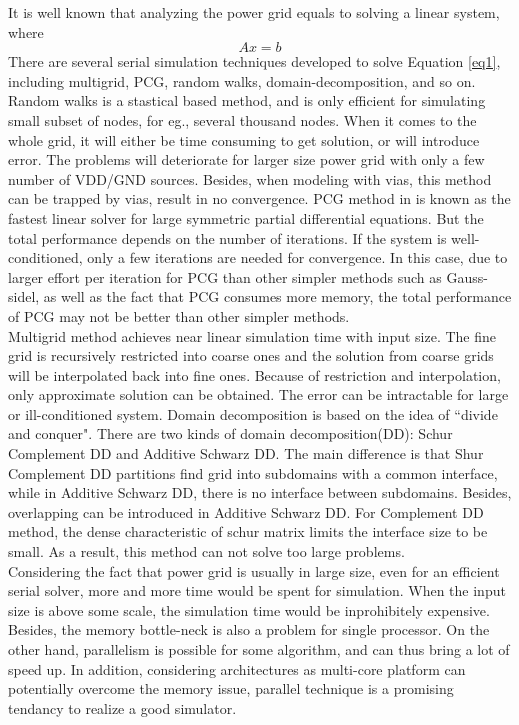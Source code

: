 \documentclass{sig-alternate}
\begin{document}
	It is well known that analyzing the power grid equals to solving a linear system, where 
	\begin{equation}\label{eq1}
		Ax=b
	\end{equation}
	There are several serial simulation techniques developed to solve Equation \eqref{eq1}, including multigrid\cite{kozhaya}, 
	PCG\cite{Tsung-Hao}, random walks\cite{Boghrati}, domain-decomposition\cite{Quming,Zhongyu}, and so on. Random walks 
	is a stastical based method, and is only efficient for simulating small subset of nodes, for eg., several thousand nodes.
	When it comes to the whole grid, it will either be time consuming to get solution, or will introduce error. The problems
	will deteriorate for larger size power grid with only a few number of VDD/GND sources. Besides, when modeling with vias, 
	this method can be trapped by vias, result in no convergence. PCG method in\cite{Tsung-Hao} is known as the fastest 
	linear solver 
	for large symmetric partial differential equations. But the total performance depends on the number of iterations. If the
	system is well-conditioned, only a few iterations are needed for convergence. In this case, due to larger effort per iteration
	for PCG than other simpler methods such as Gauss-sidel, as well as the fact that PCG consumes more memory, the total 
	performance of PCG may not be better than other simpler methods.\\	
	
	Multigrid method achieves near linear simulation time with input size. The fine grid is recursively restricted into coarse ones 
	and the solution from coarse grids will be interpolated back into fine ones. Because of restriction and interpolation, 
	only approximate solution can be obtained. The error can be intractable for large or ill-conditioned system. Domain 
	decomposition is based on the idea of ``divide and conquer". 
	There are two kinds of domain decomposition(DD): Schur Complement DD and Additive Schwarz DD. The main difference is that Shur 
	Complement DD partitions find grid into subdomains with a common interface, while in Additive Schwarz DD, there is no 
	interface between subdomains. Besides, overlapping can be introduced in Additive Schwarz DD. For Complement DD method, 
	the dense characteristic of schur matrix limits the interface size to be small. As a result, this method can not solve too 
	large problems.\\

	Considering the fact that power grid is usually in large size, even for an efficient serial solver, more and more time would be
	spent for simulation. When the input size is above some scale, the simulation time would be inprohibitely expensive.
	Besides, the memory bottle-neck is also a problem for single processor. On the other hand, parallelism is 
	possible for some algorithm, and can thus bring a lot of speed up. In addition, considering architectures as multi-core platform 
	can potentially overcome the memory issue, parallel technique is a promising tendancy to realize a good simulator.\\ 
\end{document}
